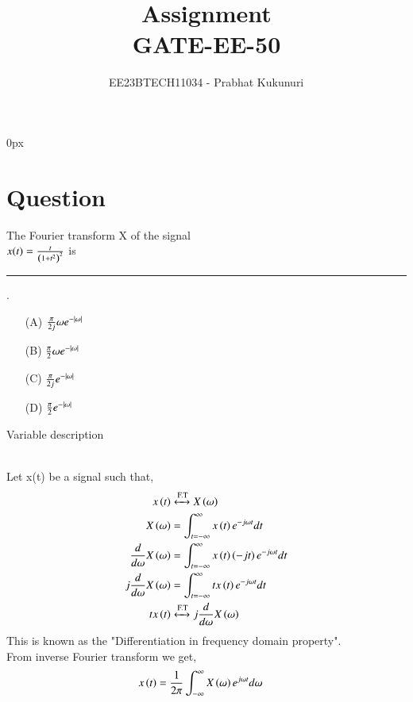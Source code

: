 \documentclass[journal,12pt,twocolumn]{IEEEtran}
\theoremstyle{remark}
\begin{document}
\parindent 0px


\vspace{3cm}

\title{Assignment\\[1ex]GATE-EE-50}
\author{EE23BTECH11034 - Prabhat Kukunuri$^{}$%
}
\maketitle
\newpage
\bigskip

\renewcommand{\thefigure}{\theenumi}
\renewcommand{\thetable}{\theenumi}
\section{Question}
The Fourier transform X of the signal\\ $x(t)=\frac{t}{\left(1+t^2\right)^2}$ is \rule{1.5cm}{0.15mm}.
\begin{enumerate}
	\item[(A)] $\frac{\pi}{2j}\omega e^{-\left\vert\omega\right\vert}$
	\item[(B)] $\frac{\pi}{2}\omega e^{-\left\vert\omega\right\vert}$
	\item[(C)] $\frac{\pi}{2j}e^{-\left\vert\omega\right\vert}$
	\item[(D)] $\frac{\pi}{2}e^{-\left\vert\omega\right\vert}$
\end{enumerate}
\solution
\begin{table}[h]
    \centering
    
    \caption{Variable description}
    \label{tab:GATE-2022-15-1}
\end{table}\\
Let x(t) be a signal such that,
\begin{align}
    x\left(t\right)&\xleftrightarrow{\text{F.T}} X\left(\omega\right)\\
    X\left(\omega\right)&=\int_{t=-\infty}^{\infty}x\left(t\right)e^{-j\omega t}dt\\
    \frac{d}{d\omega}X\left(\omega\right)&=\int_{t=-\infty}^{\infty}x\left(t\right)\left(-jt\right)e^{-j\omega t}dt\\
    j\frac{d}{d\omega}X\left(\omega\right)&=\int_{t=-\infty}^{\infty}tx\left(t\right)e^{-j\omega t}dt\\
    tx\left(t\right)&\xleftrightarrow{\text{F.T}} j\frac{d}{d\omega}X\left(\omega\right)
\end{align}
This is known as the "Differentiation in frequency domain property".\\
From inverse Fourier transform we get,
\begin{align}
    x\left(t\right)&=\frac{1}{2\pi}\int_{-\infty}^{\infty}X\left(\omega\right)e^{j\omega t}d\omega
\end{align}
\end{document}
